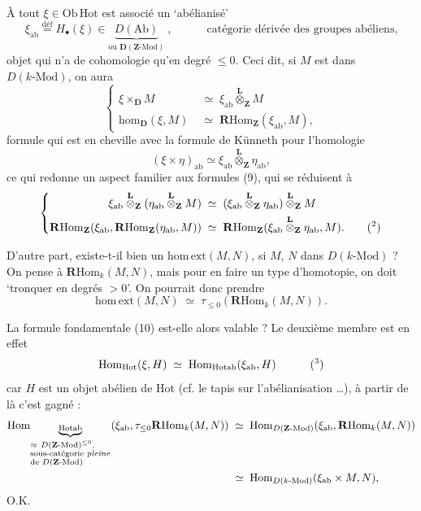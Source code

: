 \documentclass[11pt]{article}
\newcommand{\printedpage}[1]{\marginpar{\footnotesize p.~#1}}
\newcommand{\msp}[1]{\marginpar{\footnotesize [#1]}}
\newcommand{\Hot}{\mathrm{Hot}}
\newcommand{\D}{\mathbf{D}}
\newcommand{\hm}{\mathrm{hom}}
\newcommand{\Hom}{\mathrm{Hom}}
\newcommand{\homext}{\mathrm{hom}\,\mathrm{ext}}
\newcommand{\Ob}{\mathrm{Ob}\,}
\newcommand{\Ltens}{\overset{\mathbf{L}}{\otimes}}
\newcommand{\RHom}{\mathbf{R}\mathrm{Hom}}
\newcommand{\ab}{\mathrm{ab}}
\newcommand{\defeq}{\overset{\text{déf}}{=}}
\begin{document}
À tout $\xi\in\Ob\Hot$ est associé un ‘abélianisé’
\[
\xi_{\ab}\defeq H_{\bullet}(\xi)\in\underbrace{D(\mathrm{Ab})}_{\text{ou }\mathbf{D}(\mathbf{Z}\text{-Mod})}\;,\qquad\quad\text{catégorie dérivée des groupes abéliens,}
\]
objet qui n’a de cohomologie qu’en degré $\le 0$. Ceci dit, si $M$ est dans $D(k\text{-Mod})$, on aura
\[
\left\{
\begin{aligned}
\xi\times_{\D}M &\;\simeq\;\xi_{\ab}\Ltens_{\mathbf{Z}}M\\
\hm_{\D}(\xi,M) &\;\simeq\;\RHom_{\mathbf{Z}}(\xi_{\ab},M),
\end{aligned}
\right.
\tag*{(15)}
\]
formule qui est en cheville avec la formule de Künneth pour l’homologie
\[
(\xi\times\eta)_{\ab}\simeq\xi_{\ab}\Ltens_{\mathbf{Z}}\eta_{\ab},
\tag*{(16)}
\]
ce qui redonne un aspect familier aux formules (9), qui se réduisent à
\[
\left\{
\begin{aligned}
\xi_{\ab}\Ltens_{\mathbf{Z}}(\eta_{\ab}\Ltens_{\mathbf{Z}}M) &\;\simeq\;(\xi_{\ab}\Ltens_{\mathbf{Z}}\eta_{\ab})\Ltens_{\mathbf{Z}}M\\
\RHom_{\mathbf{Z}}(\xi_{\ab},\RHom_{\mathbf{Z}}(\eta_{\ab},M)) &\;\simeq\;\RHom_{\mathbf{Z}}(\xi_{\ab}\Ltens_{\mathbf{Z}}\eta_{\ab},M).\qquad\text{(\footnotemark[2])}
\end{aligned}
\right.
\]

D’autre part, existe-t-il bien un $\homext(M,N)$, si $M$, $N$ dans $D(k\text{-Mod})$ ? On pense à $\RHom_k(M,N)$, mais pour en faire un type d’homotopie, on doit ‘tronquer en degrés $>0$’. On pourrait donc prendre
\[
\homext(M,N)\;\simeq\;\tau_{\le 0}(\RHom_k(M,N)).
\]

\printedpage{8}
\msp{page 12}
La formule fondamentale (10) est-elle alors valable ? Le deuxième membre est en effet
\[
\Hom_{\Hot}(\xi,H)\;\simeq\;\Hom_{\mathrm{Hotab}}(\xi_{\ab},H)\qquad\quad\text{(\footnotemark[3])}
\]
car $H$ est un objet abélien de Hot (cf. le tapis sur l’abélianisation \ldots), à partir de là c’est gagné :
\[
\begin{aligned}
\Hom_{\underbrace{\scriptstyle\mathrm{Hotab}}_{\begin{subarray}{l}\approx\ D(\mathbf{Z}\text{-Mod})^{\le 0},\\ \text{sous-catégorie \textit{pleine}}\\ \text{de }D(\mathbf{Z}\text{-Mod})\end{subarray}}}(\xi_{\ab},\tau_{\le 0}\RHom_k(M,N)) &\;\simeq\;\Hom_{D(\mathbf{Z}\text{-Mod})}(\xi_{\ab},\RHom_k(M,N))\\
&\;\simeq\;\Hom_{D(k\text{-Mod})}(\xi_{\ab}\times M,N),
\end{aligned}
\]
O.K.
\end{document}
